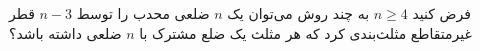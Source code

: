 \EXERCISE
فرض کنید
$n \geq 4$
به چند روش می‌توان یک
$n$
ضلعی محدب را توسط
$n - 3$
قطر غیرمتقاطع مثلث‌بندی کرد که هر مثلث یک ضلع مشترک با
$n$
ضلعی داشته باشد؟